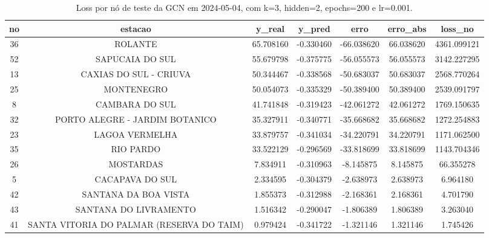 \begin{table}[h]
\centering
\caption{Loss por nó de teste da GCN em 2024-05-04, com k=3, hidden=2, epochs=200 e lr=0.001.}
\label{tab:gcn_loss_nodes_k3_hidden2}
\begin{tabular}{ccccccc}
\toprule
no & estacao & y\_real & y\_pred & erro & erro\_abs & loss\_no \\
\midrule
36 & ROLANTE & 65.708160 & -0.330460 & -66.038620 & 66.038620 & 4361.099121 \\
52 & SAPUCAIA DO SUL & 55.679798 & -0.375775 & -56.055573 & 56.055573 & 3142.227295 \\
13 & CAXIAS DO SUL - CRIUVA & 50.344467 & -0.338568 & -50.683037 & 50.683037 & 2568.770264 \\
25 & MONTENEGRO & 50.054073 & -0.335329 & -50.389400 & 50.389400 & 2539.091797 \\
8 & CAMBARA DO SUL & 41.741848 & -0.319423 & -42.061272 & 42.061272 & 1769.150635 \\
32 & PORTO ALEGRE - JARDIM BOTANICO & 35.327911 & -0.340771 & -35.668682 & 35.668682 & 1272.254883 \\
23 & LAGOA VERMELHA & 33.879757 & -0.341034 & -34.220791 & 34.220791 & 1171.062500 \\
35 & RIO PARDO & 33.522129 & -0.296569 & -33.818699 & 33.818699 & 1143.704346 \\
26 & MOSTARDAS & 7.834911 & -0.310963 & -8.145875 & 8.145875 & 66.355278 \\
5 & CACAPAVA DO SUL & 2.334595 & -0.304379 & -2.638973 & 2.638973 & 6.964180 \\
42 & SANTANA DA BOA VISTA & 1.855373 & -0.312988 & -2.168361 & 2.168361 & 4.701790 \\
43 & SANTANA DO LIVRAMENTO & 1.516342 & -0.290047 & -1.806389 & 1.806389 & 3.263040 \\
41 & SANTA VITORIA DO PALMAR (RESERVA DO TAIM) & 0.979424 & -0.341722 & -1.321146 & 1.321146 & 1.745426 \\
\bottomrule
\end{tabular}
\end{table}
